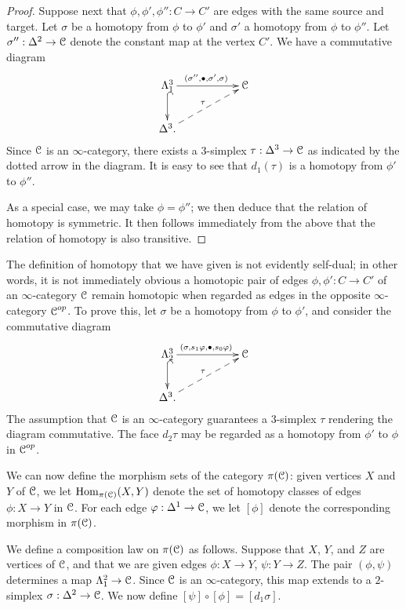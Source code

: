 \begin{1.2.3 The homotopy category}
\begin{proof}
Suppose next that $\phi, \phi', \phi'': C \rightarrow C'$ are edges with the same source and target. Let $\sigma$
be a homotopy from $\phi$ to $\phi'$ and $\sigma'$ a homotopy from
$\phi$ to $\phi''$. Let $\sigma'': \Delta^2 \rightarrow \operatorname{\mathcal{C}}$ denote the
constant map at the vertex $C'$. 
We have a commutative diagram
$$ \xymatrix{ \Lambda^3_1 \ar@{^{(}->}[d] \ar[rr]^{ (\sigma'', \bigdot, \sigma', \sigma) } & & \calC \\
\Delta^3 \ar@{-->}[urr]^{\tau}. & & }$$
Since $\operatorname{\mathcal{C}}$ is an $\infty$-category, there exists a $3$-simplex $\tau: \Delta^3 \rightarrow \operatorname{\mathcal{C}}$ as indicated by the dotted arrow in the diagram. It is easy to see that
$d_1(\tau)$ is a homotopy from $\phi'$ to $\phi''$.

As a special case, we may take $\phi=\phi''$; we then deduce that
the relation of homotopy is symmetric. It then follows immediately
from the above that the relation of homotopy is also transitive.
\end{proof}

\begin{remark}\label{cello}
The definition of homotopy that we have given is not evidently self-dual; in other words, 
it is not immediately obvious a homotopic pair of edges $\phi, \phi': C \rightarrow C'$ of an $\infty$-category $\operatorname{\mathcal{C}}$ remain homotopic when regarded as edges in the opposite $\infty$-category $\operatorname{\mathcal{C}}^{op}$. To prove this, let $\sigma$ be a homotopy from $\phi$ to $\phi'$, and consider
the commutative diagram
$$ \xymatrix{ \Lambda^3_2 \ar@{^{(}->}[d] \ar[rr]^{ ( \sigma, s_1 \phi, \bigdot, s_0 \phi)} & & \calC \\
\Delta^3 \ar@{-->}[urr]^{\tau}. & & }$$
The assumption that $\operatorname{\mathcal{C}}$ is an $\infty$-category guarantees a $3$-simplex
$\tau$ rendering the diagram commutative. The face $d_2 \tau$ may be regarded as a homotopy
from $\phi'$ to $\phi$ in $\operatorname{\mathcal{C}}^{op}$.
\end{remark}

We can now define the morphism sets of the category $\pi(\operatorname{\mathcal{C}})$: given vertices $X$ and $Y$ of $\operatorname{\mathcal{C}}$, we let $\operatorname{Hom}_{\pi(\operatorname{\mathcal{C}})}(X,Y)$ denote the set of homotopy
classes of edges $\phi: X \rightarrow Y$ in $\operatorname{\mathcal{C}}$. For each edge
$\varphi: \Delta^1 \rightarrow \operatorname{\mathcal{C}}$, we let $[ \phi ]$ denote the corresponding morphism in
$\pi(\operatorname{\mathcal{C}})$.

We define a composition law on $\pi(\operatorname{\mathcal{C}})$ as follows. Suppose that $X$, $Y$, and $Z$ are vertices of $\operatorname{\mathcal{C}}$, and that we are given 
edges $\phi: X \rightarrow Y$, $ \psi : Y \rightarrow Z$.
The pair $(\phi, \psi)$ determines a map $\Lambda^2_1 \rightarrow \operatorname{\mathcal{C}}$. Since $\operatorname{\mathcal{C}}$ is an $\infty$-category, this map extends to a $2$-simplex $\sigma: \Delta^2 \rightarrow \operatorname{\mathcal{C}}$. We now define
$[ \psi] \circ [ \phi ] = [ d_1 \sigma ]$.


\end{1.2.3 The homotopy category}
